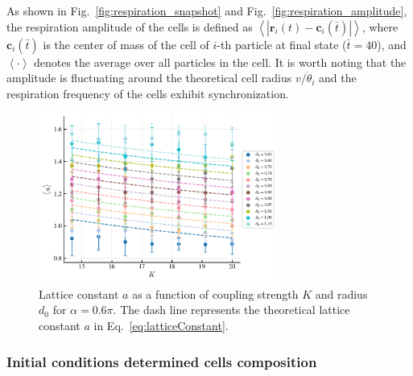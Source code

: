 \documentclass{article}
\begin{document}
As shown in Fig.~\ref{fig:respiration_snapshot} and Fig.~\ref{fig:respiration_amplitude}, the respiration amplitude of the cells is defined as $\left< \left| \mathbf{r}_i\left( t \right) -\mathbf{c}_i\left( \bar{t} \right) \right| \right> $, where $\mathbf{c}_i(\bar{t})$ is the center of mass of the cell of $i$-th particle at final state ($\bar{t}=40$), and $\left< \cdot \right>$ denotes the average over all particles in the cell. It is worth noting that the amplitude is fluctuating around the theoretical cell radius $v/\dot{\theta}_i$ and the
respiration frequency of the cells exhibit synchronization.

\begin{figure}[H]
    \centering
    \includegraphics[width=0.7\textwidth]{./figs/lattice_constant.pdf}
    \caption{
        Lattice constant $a$ as a function of coupling strength $K$ and radius $d_0$ for $\alpha=0.6\pi$. The dash line represents the theoretical lattice constant $a$ in Eq.~\eqref{eq:latticeConstant}.
    }
\end{figure}

\newpage
\subsubsection{Initial conditions determined cells composition \label{sec:cellComposition}}
\end{document}

